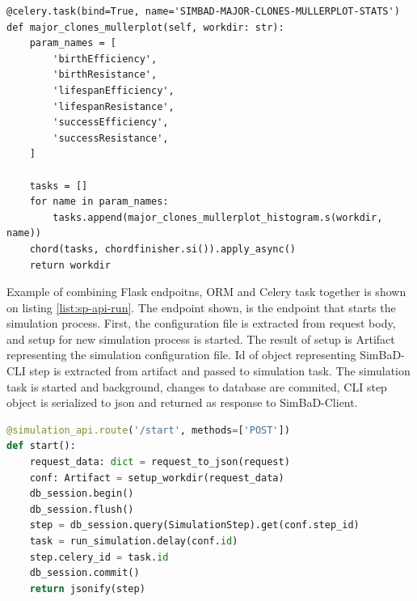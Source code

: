 \begin{lstlisting}[label=list:sp-celery-chord,caption=Start simulation endpoint, basicstyle=\footnotesize\ttfamily]
@celery.task(bind=True, name='SIMBAD-MAJOR-CLONES-MULLERPLOT-STATS')
def major_clones_mullerplot(self, workdir: str):
    param_names = [
        'birthEfficiency',
        'birthResistance',
        'lifespanEfficiency',
        'lifespanResistance',
        'successEfficiency',
        'successResistance',
    ]

    tasks = []
    for name in param_names:
        tasks.append(major_clones_mullerplot_histogram.s(workdir, name))
    chord(tasks, chordfinisher.si()).apply_async()
    return workdir
\end{lstlisting}
Example of combining Flask endpoitns, ORM and Celery task together is shown on listing \ref{list:sp-api-run}. The endpoint shown, is the endpoint that starts the simulation process.
First, the configuration file is extracted from request body, and setup for new simulation process is started. The result of setup is Artifact representing the simulation configuration file. Id of object representing SimBaD-CLI step is extracted from artifact and passed to simulation task. The simulation task is started and background, changes to database are commited, CLI step object is serialized to json and returned as response to SimBaD-Client.
\begin{lstlisting}[label=list:sp-api-run,caption=Start simulation endpoint, basicstyle=\footnotesize\ttfamily, language=python]
@simulation_api.route('/start', methods=['POST'])
def start():
    request_data: dict = request_to_json(request)
    conf: Artifact = setup_workdir(request_data)
    db_session.begin()
    db_session.flush()
    step = db_session.query(SimulationStep).get(conf.step_id)
    task = run_simulation.delay(conf.id)
    step.celery_id = task.id
    db_session.commit()
    return jsonify(step)
\end{lstlisting}
